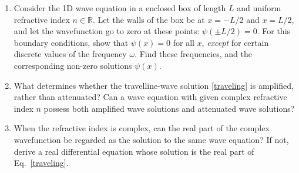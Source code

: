 \documentclass[10pt,a4paper]{article}
\begin{document}
\begin{enumerate}
\item 
Consider the 1D wave equation in a enclosed box of length $L$ and
uniform refractive index $n\in\mathbb{R}$. Let the walls of the box be
at $x = -L/2$ and $x = L/2$, and let the wavefunction go to zero at
these points: $\psi(\pm L/2) = 0$. For this boundary conditions, show
that $\psi(x) = 0$ for all $x$, \emph{except} for certain discrete
values of the frequency $\omega$. Find these frequencies, and the
corresponding non-zero solutions $\psi(x)$.

\item
  What determines whether the travelline-wave solution
  \eqref{traveling} is amplified, rather than attenuated? Can a wave
  equation with given complex refractive index $n$ possess both
  amplified wave solutions and attenuated wave solutions?

\item
  When the refractive index is complex, can the real part of the
  complex wavefunction be regarded as the solution to the same wave
  equation? If not, derive a real differential equation whose solution
  is the real part of Eq.~\eqref{traveling}.
\end{enumerate}
    
\end{document}
